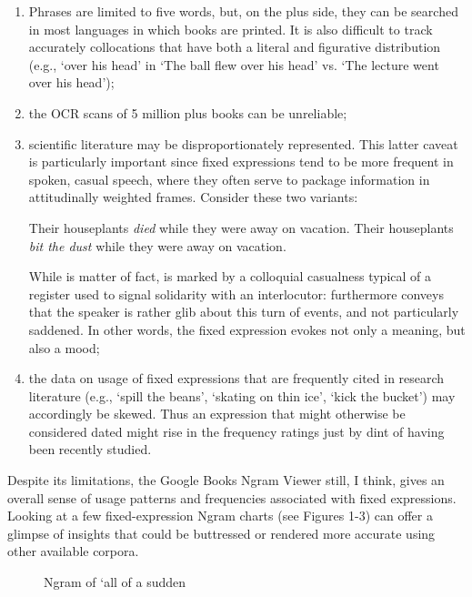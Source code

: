 \documentclass[output=paper]{langsci/langscibook}
\begin{document}
\begin{enumerate}
\item Phrases are limited to five words, but, on the plus side, they can be searched in most languages in which books are printed. It is also difficult to track accurately collocations that have both a literal and figurative distribution (e.g., ‘over his head’ in ‘The ball flew over his head’ vs. ‘The lecture went over his head’); 
\item the OCR scans of 5 million plus books can be unreliable; 
\item scientific literature may be disproportionately represented. This latter caveat is particularly important since fixed expressions tend to be more frequent in spoken, casual speech, where they often serve to package information in attitudinally weighted frames. Consider these two variants: 

\ea \label{ex:6:1} Their houseplants \textit{died} while they were away on vacation.
\ex \label{ex:6:2} Their houseplants \textit{bit the dust} while they were away on vacation.
\z

While  is matter of fact,  is marked by a colloquial casualness typical of a register used to signal solidarity with an interlocutor:  furthermore conveys that the speaker is rather glib about this turn of events, and not particularly saddened. In other words, the fixed expression evokes not only a meaning, but also a mood;

\item the data on usage of fixed expressions that are frequently cited in research literature (e.g., ‘spill the beans’, ‘skating on thin ice’, ‘kick the bucket’) may accordingly be skewed. Thus an expression that might otherwise be considered dated might rise in the frequency ratings just by dint of having been recently studied.
\end{enumerate}

Despite its limitations, the Google Books Ngram Viewer still, I think, gives an overall sense of usage patterns and frequencies associated with fixed expressions. Looking at a few fixed-expression Ngram charts (see Figures 1-3) can offer a glimpse of insights that could be buttressed or rendered more accurate using other available corpora. 

\begin{figure}
    \caption{Ngram of ‘all of a sudden} %
    \label{fig:6:1}
\end{figure}
\end{document}
